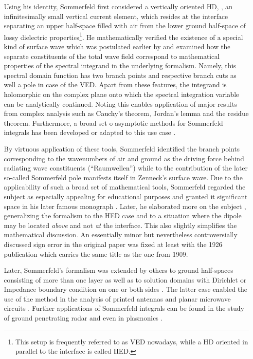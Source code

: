Using his identity, Sommerfeld first considered a vertically oriented
\ac{HD}, \ie, an infinitesimally small vertical current element, which resides
at the interface separating an upper half-space filled with air from the lower
ground half-space of lossy dielectric properties\footnote{
This setup is frequently referred to as \ac{VED} nowadays, while a \ac{HD}
oriented in parallel to the interface is called \ac{HED}.
}.
He mathematically verified the existence of a special kind of surface
wave which was postulated earlier by \textcite{Zenneck1907} and examined how the
separate constituents of the total wave field correspond to mathematical
properties of the spectral integrand in the underlying formalism.
Namely, this spectral domain function has two branch points and respective
branch cuts as well a pole in case of the \ac{VED}.
Apart from these features, the integrand is holomorphic on
the complex plane onto which the spectral integration variable can be
analytically continued.
Noting this enables application of major results from complex analysis such as
Cauchy's theorem, Jordan's lemma and the residue theorem.
Furthermore, a broad set o asymptotic methods for Sommerfeld integrals has been
developed or adapted to this use case \cite[\S2.5]{Chew1999}.

By virtuous application of these tools, Sommerfeld identified the branch points
corresponding to the wavenumbers of air and ground as the driving force behind
radiating wave constituents (\enquote{Raumwellen}) while to the contribution
of the later so-called Sommerfeld pole \cite{Michalski2016b} manifests itself
in Zenneck's surface wave.
Due to the applicability of such a broad set of mathematical tools, Sommerfeld
regarded the subject as especially appealing for educational purposes and
granted it significant space in his later famous monograph
\cite{Sommerfeld1964}.
Later, he elaborated more on the subject \cite{Sommerfeld1926},
generalizing the formalism to the \ac{HED} case and to a situation where the
dipole may be located \emph{above} and not \emph{at} the interface.
This also slightly simplifies the mathematical discussion.
An essentially minor but nevertheless controversially discussed
\cite{Wait1998,Michalski2016b} sign error in the original paper was fixed at
least with the 1926 publication \cite{Sommerfeld1926} which carries the same
title as the one from 1909.

Later, Sommerfeld's formalism was extended by others to ground half-spaces
consisting of more than one layer \cite{Felsen1994,Wait1998} as well as to
solution domains with Dirichlet or Impedance boundary condition on one or both
sides \cite{Michalski1990}.
The latter case enabled the use of the method in the analysis of printed
antennas and planar microwave circuits \cite{Hsu1993,Ho1994}.
Further applications of Sommerfeld integrals can be found in the study of ground
penetrating radar \cite{cross2015} and even in plasmonics \cite{nevels2014}.


